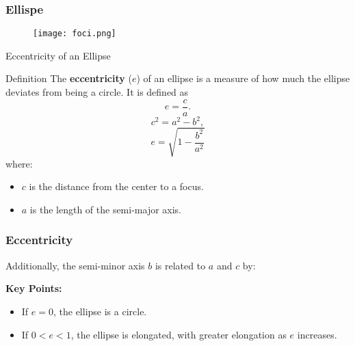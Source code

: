  \begin{frame}
  \frametitle{Ellispe}
  \begin{figure}
    \centering
    \texttt{[image: foci.png]}
  \end{figure}
 \end{frame}

 \begin{frame}{Eccentricity of an Ellipse}
  \begin{block}{Definition}
      The \textbf{eccentricity} ($e$) of an ellipse is a measure of how much the ellipse deviates from being a circle. It is defined as
      \[
      e = \frac{c}{a} .
      \]
      \[
  c^2 = a^2 - b^2,
  \]
  \[e = \sqrt{1 - \frac{b^2}{a^2}}\]
      where:
      \begin{itemize}
          \item $c$ is the distance from the center to a focus.
          \item $a$ is the length of the semi-major axis.
      \end{itemize}
  \end{block}
  
  
 
\end{frame}

\begin{frame}
  \frametitle{Eccentricity}
  \bigskip
  \begin{center}
  \end{center}
  Additionally, the semi-minor axis $b$ is related to $a$ and $c$ by:
  
  \bigskip
  \textbf{Key Points:}
  \begin{itemize}
      \item If $e = 0$, the ellipse is a circle.
      \item If $0 < e < 1$, the ellipse is elongated, with greater elongation as $e$ increases.
  \end{itemize}
\end{frame}

